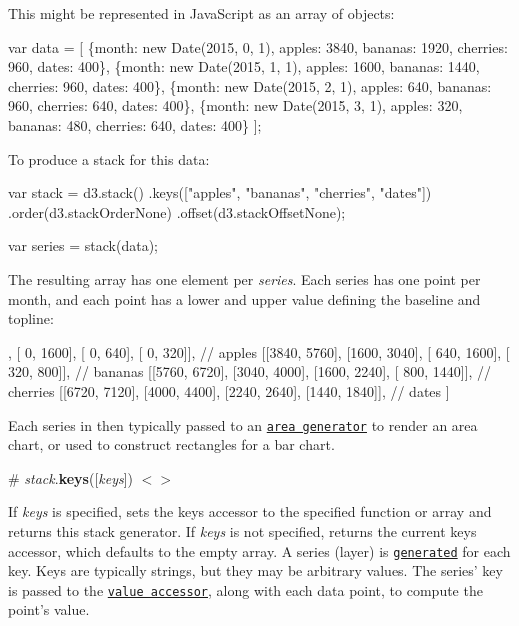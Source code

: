This might be represented in Java\+Script as an array of objects\+:


\begin{DoxyCode}
var data = [
  \{month: new Date(2015, 0, 1), apples: 3840, bananas: 1920, cherries: 960, dates: 400\},
  \{month: new Date(2015, 1, 1), apples: 1600, bananas: 1440, cherries: 960, dates: 400\},
  \{month: new Date(2015, 2, 1), apples:  640, bananas:  960, cherries: 640, dates: 400\},
  \{month: new Date(2015, 3, 1), apples:  320, bananas:  480, cherries: 640, dates: 400\}
];
\end{DoxyCode}


To produce a stack for this data\+:


\begin{DoxyCode}
var stack = d3.stack()
    .keys(["apples", "bananas", "cherries", "dates"])
    .order(d3.stackOrderNone)
    .offset(d3.stackOffsetNone);

var series = stack(data);
\end{DoxyCode}


The resulting array has one element per {\itshape series}. Each series has one point per month, and each point has a lower and upper value defining the baseline and topline\+:


\begin{DoxyCode}
[
  [[   0, 3840], [   0, 1600], [   0,  640], [   0,  320]], // apples
  [[3840, 5760], [1600, 3040], [ 640, 1600], [ 320,  800]], // bananas
  [[5760, 6720], [3040, 4000], [1600, 2240], [ 800, 1440]], // cherries
  [[6720, 7120], [4000, 4400], [2240, 2640], [1440, 1840]], // dates
]
\end{DoxyCode}


Each series in then typically passed to an \href{#areas}{\tt area generator} to render an area chart, or used to construct rectangles for a bar chart.

\label{_stack_keys}%
\# {\itshape stack}.{\bfseries keys}(\mbox{[}{\itshape keys}\mbox{]}) \href{https://github.com/d3/d3-shape/blob/master/src/stack.js#L40}{\tt $<$$>$}

If {\itshape keys} is specified, sets the keys accessor to the specified function or array and returns this stack generator. If {\itshape keys} is not specified, returns the current keys accessor, which defaults to the empty array. A series (layer) is \href{#_stack}{\tt generated} for each key. Keys are typically strings, but they may be arbitrary values. The series’ key is passed to the \href{#stack_value}{\tt value accessor}, along with each data point, to compute the point’s value.

